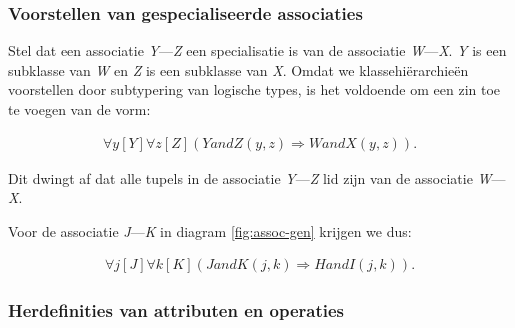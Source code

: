 \subsubsection{Voorstellen van gespecialiseerde associaties}

Stel dat een associatie \textit{Y}---\textit{Z} een specialisatie is van de associatie \textit{W}---\textit{X}. \textit{Y} is een subklasse van \textit{W} en \textit{Z} is een subklasse van \textit{X}. Omdat we klassehi\"erarchie\"en voorstellen door subtypering van logische types, is het voldoende om een zin toe te voegen van de vorm:
 
\begin{align*}
	\forall{y}[Y]\forall{z}[Z](YandZ(y, z) \Rightarrow WandX(y, z)).
\end{align*}

Dit dwingt af dat alle tupels in de associatie \textit{Y}---\textit{Z} lid zijn van de associatie \textit{W}---\textit{X}.

Voor de associatie \textit{J}---\textit{K} in diagram \ref{fig:assoc-gen} krijgen we dus:

\begin{align*}
	\forall{j}[J]\forall{k}[K](JandK(j, k) \Rightarrow HandI(j, k)).
\end{align*}

\subsubsection{Herdefinities van attributen en operaties}

